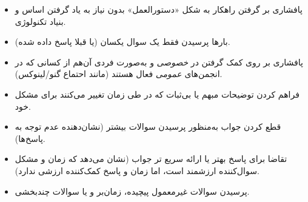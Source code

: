 \begin{itemize}
\item
پافشاری بر گرفتن راهکار به شکل «دستورالعمل» بدون نیاز
به یاد گرفتن اساس و بنیاد تکنولوژی.

\item
بارها پرسیدن فقط یک سوال یکسان (یا قبلا پاسخ داده شده).

\item
پافشاری بر روی کمک گرفتن در {\itshape خصوصی} و به‌صورت فردی
آن‌هم از کسانی که در انجمن‌های {\itshape عمومی} فعال هستند
(مانند احتماع گنو/لینوکس).

\item
فراهم کردن توضیحات مبهم یا بی‌ثبات که در طی زمان تغییر می‌کنند
برای مشکل خود.

\item
قطع کردن جواب به‌منظور پرسیدن سوالات بیشتر
(نشان‌دهنده عدم توجه به پاسخ‌ها).

\item
تقاضا برای پاسخ بهتر یا ارائه سریع تر جواب (نشان می‌دهد
که زمان و مشکل سوال‌کننده ارزشمند است، اما زمان و پاسخ
کمک‌کننده ارزشی ندارد).

\item
پرسیدن سوالات غیرمعمول پیچیده، زمان‌بر و یا سوالات چندبخشی.
\end{itemize}

